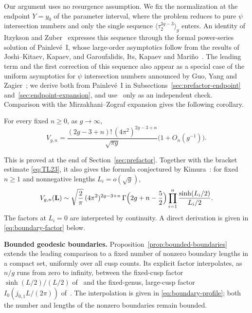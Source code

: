 Our argument uses no resurgence assumption. We fix the normalization at the endpoint $Y=y_0$ of the parameter interval, where the problem reduces to pure $\psi$ intersection numbers and only the single sequence $\langle\tau_2^{3g-3}\rangle_g$ enters. An identity of Itzykson and Zuber~\cite{IZ} expresses this sequence through the formal power-series solution of Painlev\'e~I, whose large-order asymptotics follow from the results of Joshi--Kitaev, Kapaev, and Garoufalidis, Its, Kapaev and Mari\~no~\cite{JK,Kap,GIKM}. The leading term and the first correction of this sequence also appear as a special case of the uniform asymptotics for $\psi$ intersection numbers announced by Guo, Yang and Zagier~\cite{GYZ}; we derive both from Painlev\'e~I in Subsections~\ref{sec:prefactor-endpoint} and~\ref{sec:endpoint-expansion}, and use~\cite{GYZ} only as an independent check. Comparison with the Mirzakhani--Zograf expansion gives the following corollary.
\begin{mainresult}
\begin{corollary}\label{cor:constant}
For every fixed $n\ge0$, as $g\to\infty$,
\[
 V_{g,n}=\frac{(2g-3+n)!\,(4\pi^2)^{2g-3+n}}{\sqrt{\pi g}}
 \bigl(1+O_n(g^{-1})\bigr).
\]
\end{corollary}
\end{mainresult}
This is proved at the end of Section~\ref{sec:prefactor}. Together with the bracket estimate \eqref{eq:TL23}, it also gives the formula conjectured by Kimura~\cite[equation~(28)]{Kim}: for fixed $n\ge1$ and nonnegative lengths $L_i=o(\sqrt g)$,
\[
 V_{g,n}(\mathbf L)\sim\sqrt{\frac2\pi}\,(4\pi^2)^{2g-3+n}\,\Gamma\Bigl(2g+n-\frac52\Bigr)\prod_{i=1}^n\frac{\sinh(L_i/2)}{L_i/2}.
\]
The factors at $L_i=0$ are interpreted by continuity. A direct derivation is given in \eqref{eq:boundary-factor} below.

\textbf{Bounded geodesic boundaries.} Proposition~\ref{prop:bounded-boundaries} extends the leading comparison to a fixed number of nonzero boundary lengths in a compact set, uniformly over all cusp counts. Its explicit factor interpolates, as $n/g$ runs from zero to infinity, between the fixed-cusp factor $\sinh(L/2)/(L/2)$ of~\cite{MP} and the fixed-genus, large-cusp factor $I_0(j_{0,1}L/(2\pi))$ of~\cite{HTLargeN}. The interpolation is given in \eqref{eq:boundary-profile}; both the number and lengths of the nonzero boundaries remain bounded.

